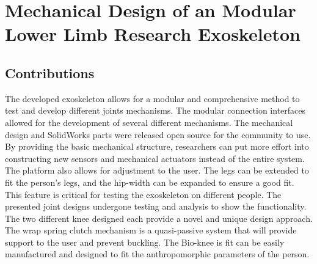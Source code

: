 
\chapter{Mechanical Design of an Modular Lower Limb Research Exoskeleton}











\section{Contributions}

The developed exoskeleton allows for a modular and comprehensive method to test and develop different joints mechanisms. The modular connection interfaces allowed for the development of several different mechanisms. The mechanical design and SolidWorks parts were released open source for the community to use. By providing the basic mechanical structure, researchers can put more effort into constructing new sensors and mechanical actuators instead of the entire system. The platform also allows for adjustment to the user. The legs can be extended to fit the person's legs, and the hip-width can be expanded to ensure a good fit. This feature is critical for testing the exoskeleton on different people. The presented joint designs undergone testing and analysis to show the functionality. The two different knee designed each provide a novel and unique design approach. The wrap spring clutch mechanism is a quasi-passive system that will provide support to the user and prevent buckling. The Bio-knee is fit can be easily manufactured and designed to fit the anthropomorphic parameters of the person.

